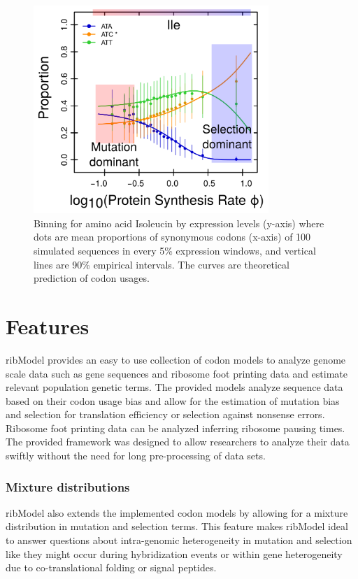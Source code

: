 \documentclass{bioinfo}
\newcommand{\package}{ribModel } %
\begin{document}
\begin{figure}[!tpb]
\centering
 \includegraphics[width=3.5in]{expl_model.png}
\vspace{-0.2cm}
\caption{Binning for amino acid Isoleucin by expression levels (y-axis) where dots are mean proportions of synonymous codons (x-axis) of 100 simulated sequences in every 5\% expression windows, and vertical lines are 90\% empirical intervals. The curves are theoretical prediction of codon usages.
}
\label{fig:plotbin}
\end{figure}

\section*{Features}
\package provides an easy to use collection of codon models to analyze genome scale data such as gene sequences and ribosome foot printing data and estimate relevant population genetic terms. 
The provided models analyze sequence data based on their codon usage bias and allow for the estimation of mutation bias and selection for translation efficiency or selection against nonsense errors. 
Ribosome foot printing data can be analyzed inferring ribosome pausing times.  
The provided framework was designed to allow researchers to analyze their data swiftly without the need for long pre-processing of data sets. 

\subsubsection*{Mixture distributions}
\package also extends the implemented codon models by allowing for a mixture distribution in mutation and selection terms.
This feature makes \package ideal to answer questions about intra-genomic heterogeneity in mutation and selection like they might occur during hybridization events or within gene heterogeneity due to co-translational folding or signal peptides.
\end{document}
